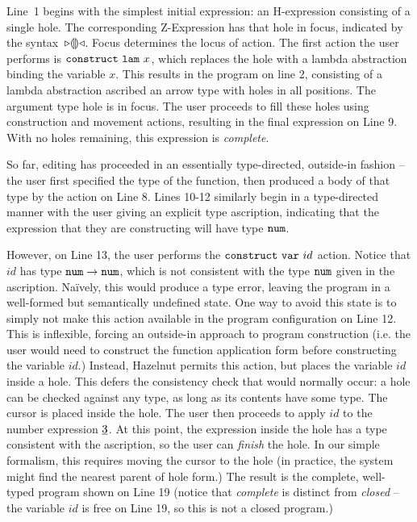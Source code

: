 Line~1 begins with the simplest initial expression: an H-expression
consisting of a single hole. The corresponding Z-Expression has that hole in focus,
indicated by the syntax~${\triangleright}{\llparenthesis\rrparenthesis}{\triangleleft}$. Focus determines the locus of action. The first action the user performs is $\mathtt{construct}~\mathtt{lam}~x$, which replaces the hole with a lambda abstraction binding the variable $x$. This results in the program on line
2, consisting of a lambda abstraction ascribed an arrow type with holes in all positions. The argument type hole is in focus. The
user proceeds to fill these holes using construction and movement actions, resulting in the final expression on Line 9. With no holes remaining, this expression is \emph{complete}.%

So far, editing has proceeded in an essentially type-directed, outside-in fashion -- the user first specified the type of the function, then produced a body of that type by the action on Line 8. Lines 10-12 similarly begin in a type-directed manner with the user giving an explicit type ascription, indicating that the expression that they are constructing will have type $\texttt{num}$. 

However, on Line 13, the user performs the $\mathtt{construct}~\mathtt{var}~id$ action. Notice that $id$ has type $\texttt{num} \rightarrow \texttt{num}$, which is not consistent with the type $\texttt{num}$ given in the ascription. Na\"ively, this would produce a type error, leaving the program in a well-formed but semantically undefined state. One way to avoid this state is to simply not make this action available in the program configuration on Line 12. This is inflexible, forcing an outside-in approach to program construction (i.e. the user would need to construct the function application form before constructing the variable $id$.) Instead, Hazelnut permits this action, but places the variable $id$ inside a hole. This defers the consistency check that would normally occur: a hole can be checked against any type, as long as its contents have some type. The cursor is placed inside the hole. The user then proceeds to apply $id$ to the number expression $\underline{3}$. At this point, the expression inside the hole has a type consistent with the ascription, so the user can \emph{finish} the hole. In our simple formalism, this requires moving the cursor to the hole (in practice, the system might find the nearest parent of hole form.) The result is the complete, well-typed program shown on Line 19 (notice that \emph{complete} is distinct from \emph{closed} -- the variable $id$ is free on Line 19, so this is not a closed program.)

